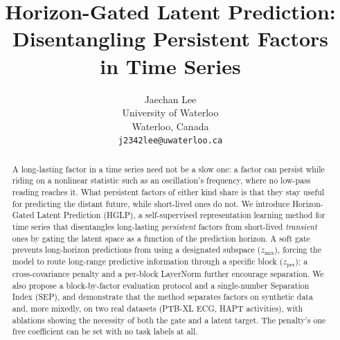 \documentclass{article}
\title{Horizon-Gated Latent Prediction:\\ Disentangling Persistent Factors\\ in Time Series}
\author{Jaechan Lee \\
University of Waterloo \\
Waterloo, Canada \\
\texttt{j2342lee@uwaterloo.ca}}
\newcommand{\zslow}{z_{\mathrm{per}}}
\newcommand{\zmix}{z_{\mathrm{mix}}}
\renewcommand{\headrulewidth}{0.4pt}%
\begin{document}
\maketitle
\thispagestyle{firstpage}
\lhead{}
\renewcommand{\headrulewidth}{0pt}

\begin{abstract}
A long-lasting factor in a time series need not be a slow one: a factor can persist while riding on a nonlinear statistic such as an oscillation's frequency, where no low-pass reading reaches it. What persistent factors of either kind share is that they stay useful for predicting the distant future, while short-lived ones do not. We introduce Horizon-Gated Latent Prediction (HGLP), a self-supervised representation learning method for time series that disentangles long-lasting \emph{persistent} factors from short-lived \emph{transient} ones by gating the latent space as a function of the prediction horizon. A soft gate prevents long-horizon predictions from using a designated subspace ($\zmix$), forcing the model to route long-range predictive information through a specific block ($\zslow$); a cross-covariance penalty and a per-block LayerNorm further encourage separation. We also propose a block-by-factor evaluation protocol and a single-number Separation Index (SEP), and demonstrate that the method separates factors on synthetic data and, more mixedly, on two real datasets (PTB-XL ECG, HAPT activities), with ablations showing the necessity of both the gate and a latent target. The penalty's one free coefficient can be set with no task labels at all.
\end{abstract}








\end{document}
